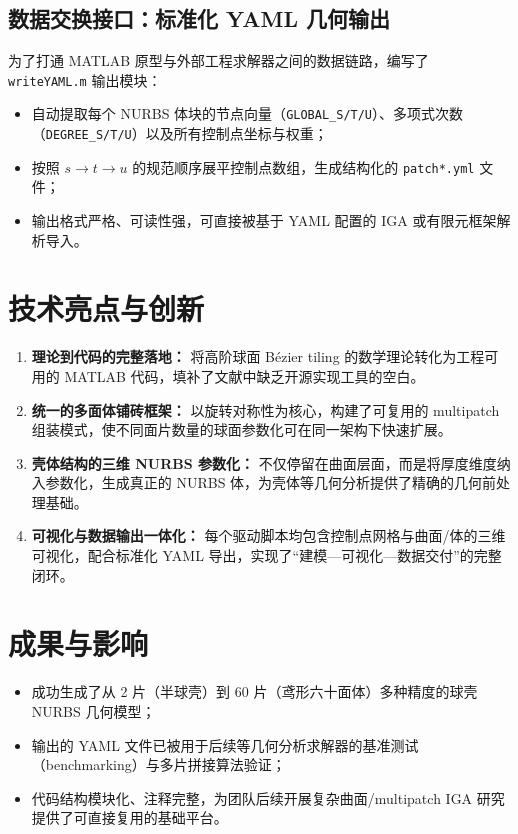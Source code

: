 \documentclass[11pt,a4paper]{article}
\begin{document}
\subsection{数据交换接口：标准化 YAML 几何输出}
为了打通 MATLAB 原型与外部工程求解器之间的数据链路，编写了 \texttt{writeYAML.m} 输出模块：
\begin{itemize}[leftmargin=2em]
    \item 自动提取每个 NURBS 体块的节点向量（\texttt{GLOBAL\_S/T/U}）、多项式次数（\texttt{DEGREE\_S/T/U}）以及所有控制点坐标与权重；
    \item 按照 $s \to t \to u$ 的规范顺序展平控制点数组，生成结构化的 \texttt{patch*.yml} 文件；
    \item 输出格式严格、可读性强，可直接被基于 YAML 配置的 IGA 或有限元框架解析导入。
\end{itemize}

\section{技术亮点与创新}
\begin{enumerate}[leftmargin=2em]
    \item \textbf{理论到代码的完整落地：} 将高阶球面 Bézier tiling 的数学理论转化为工程可用的 MATLAB 代码，填补了文献中缺乏开源实现工具的空白。
    \item \textbf{统一的多面体铺砖框架：} 以旋转对称性为核心，构建了可复用的 multipatch 组装模式，使不同面片数量的球面参数化可在同一架构下快速扩展。
    \item \textbf{壳体结构的三维 NURBS 参数化：} 不仅停留在曲面层面，而是将厚度维度纳入参数化，生成真正的 NURBS 体，为壳体等几何分析提供了精确的几何前处理基础。
    \item \textbf{可视化与数据输出一体化：} 每个驱动脚本均包含控制点网格与曲面/体的三维可视化，配合标准化 YAML 导出，实现了“建模—可视化—数据交付”的完整闭环。
\end{enumerate}

\section{成果与影响}
\begin{itemize}[leftmargin=2em]
    \item 成功生成了从 2 片（半球壳）到 60 片（鸢形六十面体）多种精度的球壳 NURBS 几何模型；
    \item 输出的 YAML 文件已被用于后续等几何分析求解器的基准测试（benchmarking）与多片拼接算法验证；
    \item 代码结构模块化、注释完整，为团队后续开展复杂曲面/multipatch IGA 研究提供了可直接复用的基础平台。
\end{itemize}
\end{document}
